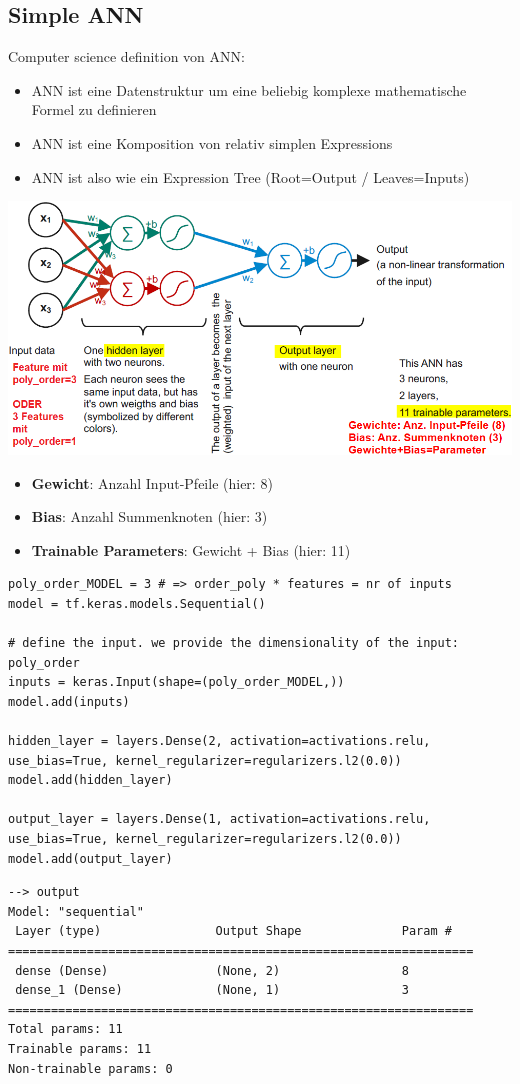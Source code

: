 \subsection{Simple ANN}
Computer science definition von ANN:
\begin{itemize}
    \item  ANN ist eine Datenstruktur um eine beliebig komplexe mathematische Formel zu definieren
	\item  ANN ist eine Komposition von relativ simplen Expressions
    \item  ANN ist also wie ein Expression Tree (Root=Output / Leaves=Inputs)
\end{itemize}

\includegraphics[width=\linewidth]{./img/ann_with_marks.png}
\begin{itemize}
    \item \textbf{Gewicht}: Anzahl Input-Pfeile (hier: 8)
    \item \textbf{Bias}: Anzahl Summenknoten (hier: 3)
    \item \textbf{Trainable Parameters}: Gewicht + Bias (hier: 11)
\end{itemize}

\begin{verbatim}
poly_order_MODEL = 3 # => order_poly * features = nr of inputs
model = tf.keras.models.Sequential()

# define the input. we provide the dimensionality of the input: poly_order
inputs = keras.Input(shape=(poly_order_MODEL,))
model.add(inputs)

hidden_layer = layers.Dense(2, activation=activations.relu, use_bias=True, kernel_regularizer=regularizers.l2(0.0))
model.add(hidden_layer)

output_layer = layers.Dense(1, activation=activations.relu, use_bias=True, kernel_regularizer=regularizers.l2(0.0))
model.add(output_layer)
\end{verbatim}
\begin{verbatim}
--> output
Model: "sequential"
 Layer (type)                Output Shape              Param #   
=================================================================
 dense (Dense)               (None, 2)                 8         
 dense_1 (Dense)             (None, 1)                 3         
=================================================================
Total params: 11
Trainable params: 11
Non-trainable params: 0
\end{verbatim}

